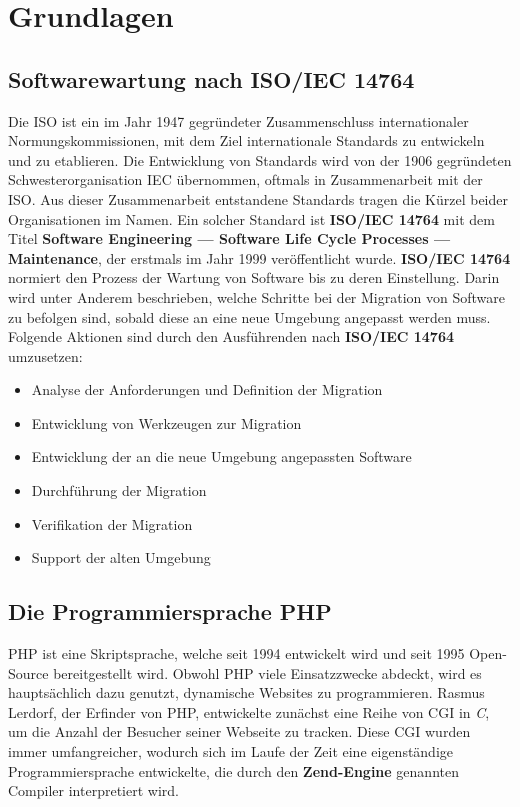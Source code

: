 \chapter{Grundlagen}\label{ch:grundlagen}

\section{Softwarewartung nach ISO/IEC 14764}
Die \ac{ISO} ist ein im Jahr 1947 gegründeter Zusammenschluss internationaler Normungskommissionen, mit dem Ziel internationale Standards zu entwickeln und zu etablieren.\cite{international_organization_for_standardization:_about_nodate}
Die Entwicklung von Standards wird von der 1906 gegründeten Schwesterorganisation \ac{IEC} übernommen, oftmals in Zusammenarbeit mit der \ac{ISO}.\cite{international_electrotechnical_commission_iec_nodate}
Aus dieser Zusammenarbeit entstandene Standards tragen die Kürzel beider Organisationen im Namen. Ein solcher Standard ist \textbf{ISO/IEC 14764} mit dem Titel
\textbf{Software Engineering — Software Life Cycle Processes — Maintenance}, der erstmals im Jahr 1999 veröffentlicht wurde.
\textbf{ISO/IEC 14764} normiert den Prozess der Wartung von Software bis zu deren Einstellung.
Darin wird unter Anderem beschrieben, welche Schritte bei der Migration von Software zu befolgen sind, sobald diese an eine neue Umgebung angepasst werden muss.
Folgende Aktionen sind durch den Ausführenden nach \textbf{ISO/IEC 14764} umzusetzen:
\begin{itemize}
    \item Analyse der Anforderungen und Definition der Migration
    \item Entwicklung von Werkzeugen zur Migration
    \item Entwicklung der an die neue Umgebung angepassten Software
    \item Durchführung der Migration
    \item Verifikation der Migration
    \item Support der alten Umgebung
\end{itemize}

\section{Die Programmiersprache PHP}
\ac{PHP} ist eine Skriptsprache, welche seit 1994 entwickelt wird und seit 1995 Open-Source bereitgestellt wird.
Obwohl \ac{PHP} viele Einsatzzwecke abdeckt, wird es hauptsächlich dazu genutzt, dynamische Websites zu programmieren. 
Rasmus Lerdorf, der Erfinder von \ac{PHP}, entwickelte zunächst eine Reihe von \ac{CGI} in \textit{C}, um die Anzahl der 
Besucher seiner Webseite zu tracken. Diese \ac{CGI} wurden immer umfangreicher, wodurch sich im Laufe der Zeit eine 
eigenständige Programmiersprache entwickelte, die durch den \textbf{Zend-Engine} genannten Compiler interpretiert wird.

